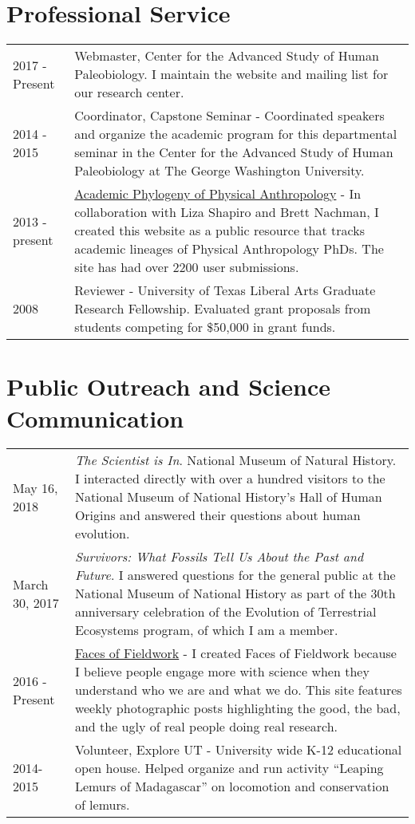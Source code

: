 \documentclass{article}
\begin{document}
\section*{Professional Service}
\begin{longtable}{p{}p{}}
2017 - Present & Webmaster, Center for the Advanced Study of Human Paleobiology. I maintain the website and mailing list for our research center.\\[4pt]
2014 - 2015 & Coordinator, Capstone Seminar - Coordinated speakers and organize the academic program for this departmental seminar in the Center for the Advanced Study of Human Paleobiology at The George Washington University. \\[4pt]
2013 - present &  \href{https://www.physanthphylogeny.org}{Academic Phylogeny of Physical Anthropology} - In collaboration with Liza Shapiro and Brett Nachman, I created this website as a public resource that tracks academic lineages of Physical Anthropology PhDs. The site has had over 2200 user submissions.\\[4pt]

 2008 & Reviewer - University of Texas Liberal Arts Graduate Research Fellowship. Evaluated grant proposals from students competing for \$50,000 in grant funds.\\
\end{longtable}

\section*{Public Outreach and Science Communication}
\begin{longtable}{p{}p{}}
May 16, 2018 & \emph{The Scientist is In}. National Museum of Natural History. I interacted directly with over a hundred visitors to the National Museum of National History's Hall of Human Origins and answered their questions about human evolution.\\[4pt]
March 30, 2017 & \emph{Survivors: What Fossils Tell Us About the Past and Future}. I answered questions for the general public at the National Museum of National History as part of the 30th anniversary celebration of the Evolution of Terrestrial Ecosystems program, of which I am a member. \\[4pt]
2016 - Present & \href{http://facesoffieldwork.com}{Faces of Fieldwork} - I created Faces of Fieldwork because I believe people engage more with science when they understand who we are and what we do. This site features weekly photographic posts highlighting the good, the bad, and the ugly of real people doing real research.\\[4pt]
2014-2015 & Volunteer, Explore UT - University wide K-12 educational open house. Helped organize and run activity ``Leaping Lemurs of Madagascar'' on locomotion and conservation of lemurs.\\
\end{longtable}
\end{document}
